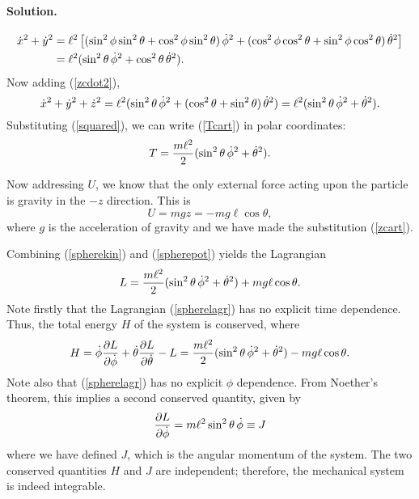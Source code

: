 \documentclass[11pt]{article}
\newcommand{\refeq}[1]{(\ref{#1})}
\newenvironment{solution}
{
    \paragraph{Solution.}
    \ignorespaces
}
{
    \bigskip
}
\begin{document}
\begin{solution}
	\begin{align}
		\dot{x}^2 + \dot{y}^2 &= \ell^2 \left[ (\sin^2{\phi} \sin^2{\theta} + \cos^2{\phi} \sin^2{\theta}) \,\dot{\phi}^2 + (\cos^2{\phi} \cos^2{\theta} + \sin^2{\phi} \cos^2{\theta}) \,\dot{\theta}^2 \right] \\
		&= \ell^2 (\sin^2{\theta} \,\dot{\phi}^2 + \cos^2{\theta} \,\dot{\theta}^2).
	\end{align}
	Now adding \refeq{zcdot2},
	\begin{equation}
		\dot{x}^2 + \dot{y}^2 + \dot{z}^2 = \ell^2 (\sin^2{\theta} \,\dot{\phi}^2 + (\cos^2{\theta} + \sin^2{\theta}) \,\dot{\theta}^2) = \ell^2 (\sin^2{\theta} \,\dot{\phi}^2 + \dot{\theta}^2). \label{sqaured}
	\end{equation}
	Substituting \refeq{squared}, we can write \refeq{Tcart} in polar coordinates:
	\begin{equation} \label{spherekin}
		T = \frac{m \ell^2}{2} (\sin^2{\theta} \,\dot{\phi}^2 + \dot{\theta}^2).
	\end{equation}
	
	Now addressing $U$, we know that the only external force acting upon the particle is gravity in the $-z$ direction.  This is
	\begin{equation} \label{spherepot}
		U = m g z = - m g \ell \cos{\theta},
	\end{equation}
	where $g$ is the acceleration of gravity and we have made the substitution \refeq{zcart}.
	
	Combining \refeq{spherekin} and \refeq{spherepot} yields the Lagrangian
	\begin{equation} \label{spherelagr}
		L = \frac{m \ell^2}{2} (\sin^2{\theta} \,\dot{\phi}^2 + \dot{\theta}^2) + m g \ell \cos{\theta}.
	\end{equation}
	Note firstly that the Lagrangian \refeq{spherelagr} has no explicit time dependence.  Thus, the total energy $H$ of the system is conserved, where
	\begin{equation} \label{consH}
		H = \dot{\phi} \pdv{L}{\dot{\phi}} + \dot{\theta} \pdv{L}{\dot{\theta}} - L = \frac{m \ell^2}{2} (\sin^2{\theta} \,\dot{\phi}^2 + \dot{\theta}^2) - m g \ell \cos{\theta}.
	\end{equation}
	Note also that \refeq{spherelagr} has no explicit $\phi$ dependence.  From Noether's theorem, this implies a second conserved quantity, given by
	\begin{equation} \label{consJ}
		\pdv{L}{\dot{\phi}} = m \ell^2 \sin^2{\theta} \,\dot{\phi} \equiv J
	\end{equation}
	where we have defined $J$, which is the angular momentum of the system.  The two conserved quantities $H$ and $J$ are independent; therefore, the mechanical system is indeed integrable.
\end{solution}
\end{document}
